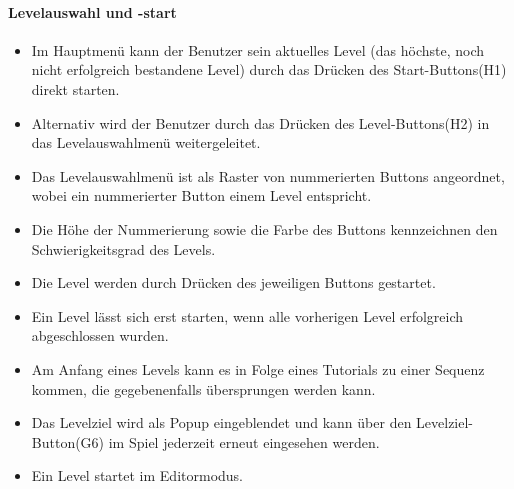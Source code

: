 \paragraph{Levelauswahl und -start}
\begin{itemize}
	\item Im Hauptmenü kann der Benutzer sein aktuelles Level (das höchste, noch nicht erfolgreich bestandene Level) durch das Drücken des Start-Buttons(H1) direkt starten.
	\item Alternativ wird der Benutzer durch das Drücken des Level-Buttons(H2) in das Levelauswahlmenü weitergeleitet.
	\item Das Levelauswahlmenü ist als Raster von nummerierten Buttons angeordnet, wobei ein nummerierter Button einem Level entspricht.
	\item Die Höhe der Nummerierung sowie die Farbe des Buttons kennzeichnen den Schwierigkeitsgrad des Levels.
	\item Die Level werden durch Drücken des jeweiligen Buttons gestartet.
	\item Ein Level lässt sich erst starten, wenn alle vorherigen Level erfolgreich abgeschlossen wurden.
	\item Am Anfang eines Levels kann es in Folge eines Tutorials zu einer Sequenz kommen, die gegebenenfalls übersprungen werden kann.
	\item Das Levelziel wird als Popup eingeblendet und kann über den Levelziel-Button(G6) im Spiel jederzeit erneut eingesehen werden.
	\item Ein Level startet im Editormodus.
\end{itemize}
